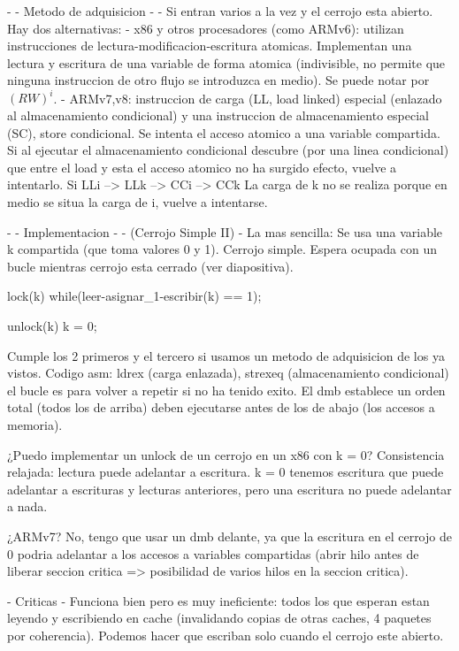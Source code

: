 - - Metodo de adquisicion - -
Si entran varios a la vez y el cerrojo esta abierto.
Hay dos alternativas:
- x86 y otros procesadores (como ARMv6): utilizan instrucciones de lectura-modificacion-escritura atomicas. Implementan una lectura y escritura de una variable de forma atomica (indivisible, no permite que ninguna instruccion de otro flujo se introduzca en medio). Se puede notar por $(RW)^i$.
- ARMv7,v8: instruccion de carga (LL, load linked) especial (enlazado al almacenamiento condicional) y una instruccion de almacenamiento especial (SC), store condicional. Se intenta el acceso atomico a una variable compartida. Si al ejecutar el almacenamiento condicional descubre (por una linea condicional) que entre el load y esta el acceso atomico no ha surgido efecto, vuelve a intentarlo.
Si LLi --> LLk --> CCi --> CCk
La carga de k no se realiza porque en medio se situa la carga de i, vuelve a intentarse.

- - Implementacion - -  (Cerrojo Simple II)
- La mas sencilla: Se usa una variable k compartida (que toma valores 0 y 1). Cerrojo simple.
Espera ocupada con un bucle mientras cerrojo esta cerrado (ver diapositiva).

lock(k){
    while(leer-asignar_1-escribir(k) == 1){};
}

unlock(k){
    k = 0;
}

Cumple los 2 primeros y el tercero si usamos un metodo de adquisicion de los ya vistos.
Codigo asm: ldrex (carga enlazada), strexeq (almacenamiento condicional) el bucle es para volver a repetir si no ha tenido exito. El dmb establece un orden total (todos los de arriba) deben ejecutarse antes de los de abajo (los accesos a memoria).


¿Puedo implementar un unlock de un cerrojo en un x86 con k = 0?
Consistencia relajada: lectura puede adelantar a escritura.
k = 0 tenemos escritura que puede adelantar a escrituras y lecturas anteriores, pero una escritura no puede adelantar a nada.

¿ARMv7?
No, tengo que usar un dmb delante, ya que la escritura en el cerrojo de 0 podria adelantar a los accesos a variables compartidas (abrir hilo antes de liberar seccion critica => posibilidad de varios hilos en la seccion critica).

- Criticas - 
Funciona bien pero es muy ineficiente: todos los que esperan estan leyendo y escribiendo en cache (invalidando copias de otras caches, 4 paquetes por coherencia).
Podemos hacer que escriban solo cuando el cerrojo este abierto.

